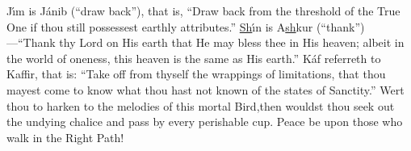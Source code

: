 \documentclass[12pt]{article}
\begin{document}
\vspace{2ex}
 {
J\'{\i}m is J\'{a}nib (``draw back''), that is, ``Draw back from the threshold of the True One if thou still possessest earthly attributes.''
}
\vspace{2ex}
 {
\underline{Sh}\'{\i}n is A\underline{sh}kur (``thank'')---``Thank thy Lord on His earth that He may bless thee in His heaven; albeit in the world of oneness, this heaven is the same as His earth.''
}
\vspace{2ex}
 {
K\'{a}f referreth to Kaffir, that is: ``Take off from thyself the wrappings of limitations, that thou mayest come to know what thou hast not known of the states of Sanctity.''\footnotemark[53]
}
\vspace{2ex}
 {
Wert thou to harken to the melodies of this mortal Bird,\footnotemark[54] then wouldst thou seek out the undying chalice and pass by every perishable cup.
}
\vspace{2ex}
 {
Peace be upon those who walk in the Right Path!
}

\end{document}
